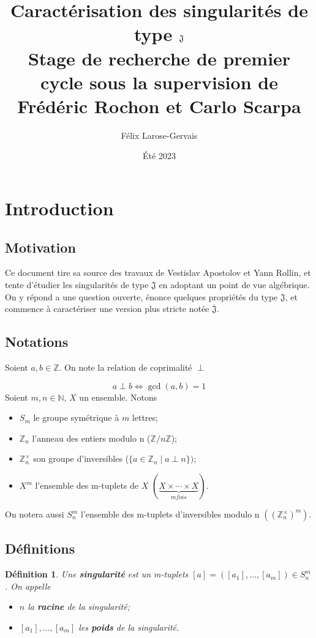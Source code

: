 \documentclass{article}
\title{%
    Caractérisation des singularités de type $\J$ \\ [2ex]
    \large Stage de recherche de premier cycle sous la supervision de \\
    Frédéric Rochon et Carlo Scarpa}
\author{Félix Larose-Gervais}
\date{Été 2023}
\newtheorem{definition}{Définition}
\newcommand{\J}{\mathfrak{J}}
\newcommand{\JS}{\overline{\J}}
\begin{document}
\maketitle

\tableofcontents

\newpage

\section{Introduction}

\subsection{Motivation}

Ce document tire sa source des travaux\cite{apostolov2016ale} de Vestislav Apostolov et Yann Rollin, 
et tente d'étudier les singularités de type $\J$ en adoptant un point de vue algébrique.
On y répond a une question ouverte, énonce quelques propriétés du type $\J$, et commence à caractériser 
une version plus stricte notée $\JS$.

\subsection{Notations}

Soient $a, b \in \mathbb{Z}$. On note la relation de coprimalité $\perp$

\[ a \perp b \iff \gcd(a, b) = 1 \]
Soient $m, n \in \mathbb{N}$, $X$ un ensemble. Notons 

\begin{itemize}
    \item $S_m$ le groupe symétrique à $m$ lettres;
    \item $\mathbb{Z}_n$ l'anneau des entiers modulo n ($\mathbb{Z}/n\mathbb{Z}$);
    \item $\mathbb{Z}_n^\times$ son groupe d'inversibles ($\{ a \in \mathbb{Z}_n \mid a \perp n \})$;
    \item $X^m$ l'ensemble des m-tuplets de $X$ $(\underbrace{X \times \cdots \times X}_{m fois})$.
\end{itemize}
On notera aussi $S_n^m$ l'ensemble des m-tuplets d'inversibles modulo n $({({\mathbb{Z}_n^\times})}^m)$.

\subsection{Définitions}

\begin{definition}
    Une \textbf{singularité} est un m-tuplets $[a] = ([a_1], \dots, [a_m]) \in S_n^m$. On appelle \begin{itemize}
        \item $n$ la \textbf{racine} de la singularité;
        \item $[a_1], \dots, [a_m]$ les \textbf{poids} de la singularité.
    \end{itemize}
\end{definition}
\end{document}
